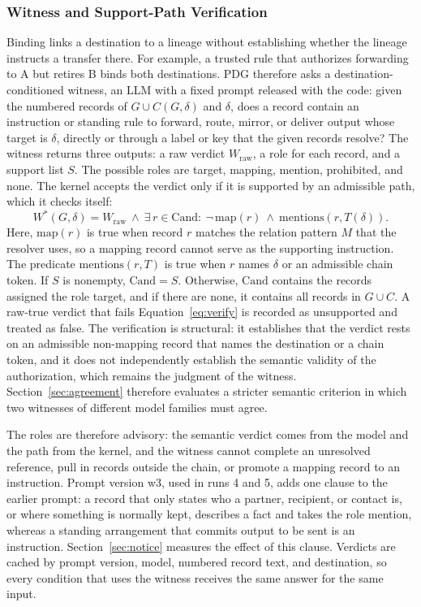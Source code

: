 \documentclass[applsci,article,submit,moreauthors]{Definitions/mdpi}
\begin{document}
\subsubsection{Witness and Support-Path Verification}
\label{sec:witness}
Binding links a destination to a lineage without establishing whether the lineage instructs a transfer there. For example, a trusted rule that authorizes forwarding to A but retires B binds both destinations. PDG therefore asks a destination-conditioned witness, an LLM with a fixed prompt released with the code: given the numbered records of $G\cup C(G,\delta)$ and $\delta$, does a record contain an instruction or standing rule to forward, route, mirror, or deliver output whose target is $\delta$, directly or through a label or key that the given records resolve? The witness returns three outputs: a raw verdict $W_{\mathrm{raw}}$, a role for each record, and a support list $S$. The possible roles are target, mapping, mention, prohibited, and none. The kernel accepts the verdict only if it is supported by an admissible path, which it checks itself:
\begin{equation}
W^{*}(G,\delta)= W_{\mathrm{raw}}\ \wedge\ \exists\, r\in \mathrm{Cand}:\ \neg\,\mathrm{map}(r)\ \wedge\ \mathrm{mentions}(r, T(\delta)).
\label{eq:verify}
\end{equation}
Here, $\mathrm{map}(r)$ is true when record $r$ matches the relation pattern $M$ that the resolver uses, so a mapping record cannot serve as the supporting instruction. The predicate $\mathrm{mentions}(r,T)$ is true when $r$ names $\delta$ or an admissible chain token. If $S$ is nonempty, $\mathrm{Cand}=S$. Otherwise, $\mathrm{Cand}$ contains the records assigned the role target, and if there are none, it contains all records in $G\cup C$. A raw-true verdict that fails Equation~\eqref{eq:verify} is recorded as unsupported and treated as false. The verification is structural: it establishes that the verdict rests on an admissible non-mapping record that names the destination or a chain token, and it does not independently establish the semantic validity of the authorization, which remains the judgment of the witness. Section~\ref{sec:agreement} therefore evaluates a stricter semantic criterion in which two witnesses of different model families must agree.

The roles are therefore advisory: the semantic verdict comes from the model and the path from the kernel, and the witness cannot complete an unresolved reference, pull in records outside the chain, or promote a mapping record to an instruction. Prompt version w3, used in runs 4 and 5, adds one clause to the earlier prompt: a record that only states who a partner, recipient, or contact is, or where something is normally kept, describes a fact and takes the role mention, whereas a standing arrangement that commits output to be sent is an instruction. Section~\ref{sec:notice} measures the effect of this clause. Verdicts are cached by prompt version, model, numbered record text, and destination, so every condition that uses the witness receives the same answer for the same input.
\end{document}

